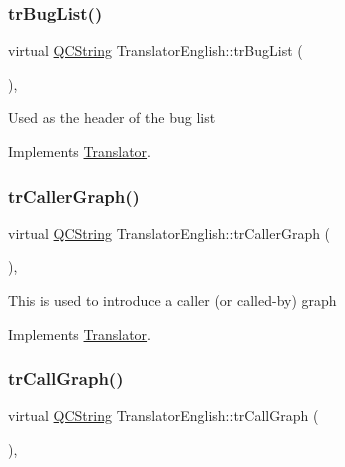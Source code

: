 \subsubsection{\texorpdfstring{trBugList()}{trBugList()}}
{\footnotesize\ttfamily virtual \mbox{\hyperlink{class_q_c_string}{Q\+C\+String}} Translator\+English\+::tr\+Bug\+List (\begin{DoxyParamCaption}{ }\end{DoxyParamCaption})\hspace{0.3cm}{\ttfamily [inline]}, {\ttfamily [virtual]}}

Used as the header of the bug list 

Implements \mbox{\hyperlink{class_translator}{Translator}}.

\mbox{\label{class_translator_english_a33d7e680cba09f3525f9afaf481d6e7c}} 
\subsubsection{\texorpdfstring{trCallerGraph()}{trCallerGraph()}}
{\footnotesize\ttfamily virtual \mbox{\hyperlink{class_q_c_string}{Q\+C\+String}} Translator\+English\+::tr\+Caller\+Graph (\begin{DoxyParamCaption}{ }\end{DoxyParamCaption})\hspace{0.3cm}{\ttfamily [inline]}, {\ttfamily [virtual]}}

This is used to introduce a caller (or called-\/by) graph 

Implements \mbox{\hyperlink{class_translator}{Translator}}.

\mbox{\label{class_translator_english_a517d31e05fa1335c09cc932e4b801324}} 
\subsubsection{\texorpdfstring{trCallGraph()}{trCallGraph()}}
{\footnotesize\ttfamily virtual \mbox{\hyperlink{class_q_c_string}{Q\+C\+String}} Translator\+English\+::tr\+Call\+Graph (\begin{DoxyParamCaption}{ }\end{DoxyParamCaption})\hspace{0.3cm}{\ttfamily [inline]}, {\ttfamily [virtual]}}

